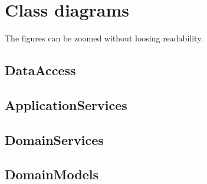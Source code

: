 \chapter{Class diagrams}
\label{app:class_diagrams}
The figures can be zoomed without loosing readability.

\section{DataAccess}


\section{ApplicationServices}


\section{DomainServices}


\section{DomainModels}


